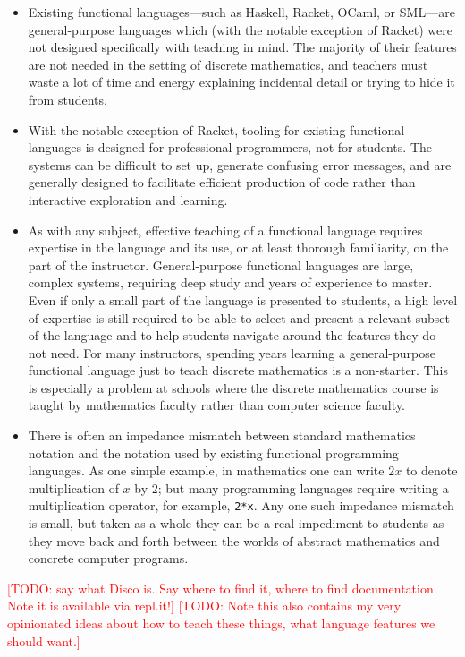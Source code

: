 \documentclass[submission,copyright,creativecommons]{eptcs}
\newcommand{\todo}[1]{\textcolor{red}{[TODO: #1]}}
\newcommand{\todo}[1]{}
\begin{document}
\begin{itemize}
\item Existing functional languages---such as Haskell, Racket, OCaml,
  or SML---are general-purpose languages which (with the notable
  exception of Racket) were not designed specifically with teaching in
  mind.  The majority of their features are not needed in the setting
  of discrete mathematics, and teachers must waste a lot of time and
  energy explaining incidental detail or trying to hide it from
  students.
\item With the notable exception of Racket, tooling for existing
  functional languages is designed for professional programmers, not
  for students.  The systems can be difficult to set up, generate
  confusing error messages, and are generally designed to facilitate
  efficient production of code rather than interactive exploration and
  learning.
\item As with any subject, effective teaching of a functional language
  requires expertise in the language and its use, or at least thorough
  familiarity, on the part of the instructor. General-purpose
  functional languages are large, complex systems, requiring deep
  study and years of experience to master.  Even if only a small part
  of the language is presented to students, a high level of expertise
  is still required to be able to select and present a relevant subset
  of the language and to help students navigate around the features
  they do not need.  For many instructors, spending years learning a
  general-purpose functional language just to teach discrete
  mathematics is a non-starter.  This is especially a problem at
  schools where the discrete mathematics course is taught by
  mathematics faculty rather than computer science faculty.
\item There is often an impedance mismatch between standard
  mathematics notation and the notation used by existing functional
  programming languages.  As one simple example, in mathematics one
  can write $2x$ to denote multiplication of $x$ by $2$; but many
  programming languages require writing a multiplication operator, for
  example, \texttt{2*x}.  Any one such impedance mismatch is small, but taken
  as a whole they can be a real impediment to students as they move
  back and forth between the worlds of abstract mathematics and
  concrete computer programs.
\end{itemize}

\todo{say what Disco is.  Say where to find it, where to find
  documentation.  Note it is available via repl.it!}
\todo{Note this also contains my very opinionated ideas about how to
  teach these things, what language features we should want.}
\end{document}
